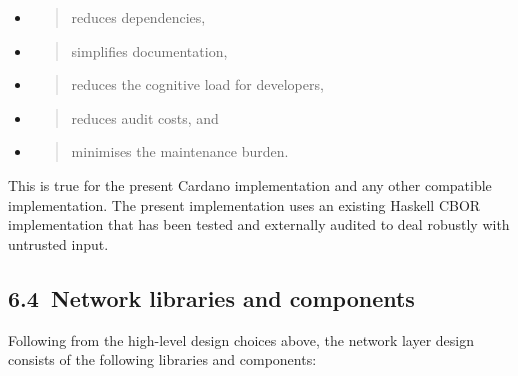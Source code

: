 \documentclass[]{article}
\begin{document}
\begin{itemize}
\item
  \begin{quote}
  reduces dependencies,
  \end{quote}
\item
  \begin{quote}
  simplifies documentation,
  \end{quote}
\item
  \begin{quote}
  reduces the cognitive load for developers,
  \end{quote}
\item
  \begin{quote}
  reduces audit costs, and
  \end{quote}
\item
  \begin{quote}
  minimises the maintenance burden.
  \end{quote}
\end{itemize}

This is true for the present Cardano implementation and any other
compatible implementation. The present implementation uses an existing
Haskell CBOR implementation that has been tested and externally audited
to deal robustly with untrusted input.

\hypertarget{network-libraries-and-components}{%
\subsection{​6.4​~Network libraries and
components}\label{network-libraries-and-components}}

Following from the high-level design choices above, the network layer
design consists of the following libraries and components:
\end{document}
